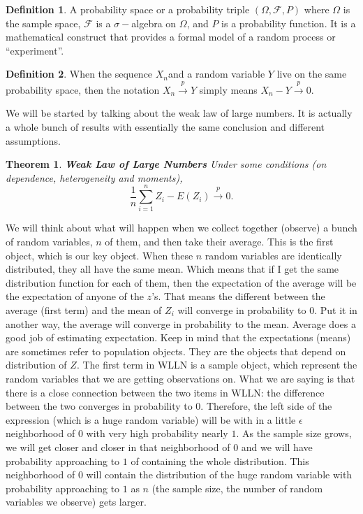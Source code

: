 \documentclass[11pt,a4paper]{amsart}
\theoremstyle{plain}
\newtheorem{theorem}{Theorem}
\theoremstyle{definition}
\newtheorem{definition}{Definition}
\begin{document}
	\begin{definition}
		A probability space or a probability triple $(\Omega ,\mathcal {F},P)$ where $\Omega$ is the sample space, $\mathcal {F}$ is a $\sigma-$algebra on $\Omega$, and $P$ is a probability function. It is a mathematical construct that provides a formal model of a random process or ``experiment''. 
	\end{definition}
	\begin{definition}
		When the sequence $X_{n}$and a random variable $Y$ live on the same probability space, then the notation $X_{n} \xrightarrow{p} Y$ simply means $X_{n} - Y \xrightarrow{p} 0$.
	\end{definition}
	We will be started by talking about the weak law of large numbers. It is actually a whole bunch of results with essentially the same conclusion and different assumptions.  
	\begin{theorem}
		\textbf{Weak Law of Large Numbers} Under some conditions (on dependence, heterogeneity and moments), 
		\[	\frac{1}{n} \sum_{i=1}^{n} Z_{i} - E(Z_{i}) \xrightarrow{p} 0.	\]
	\end{theorem}
	We will think about what will happen when we collect together (observe) a bunch of random variables, $n$ of them, and then take their average. This is the first object, which is our key object. When these $n$ random variables are identically distributed, they all have the same mean. Which means that if I get the same distribution function for each of them, then the expectation of the average will be the expectation of anyone of the $z$'s. That means the different between the average (first term) and the mean of $Z_{i}$ will converge in probability to $0$. Put it in another way, the average will converge in probability to the mean. Average does a good job of estimating expectation. Keep in mind that the expectations (means) are sometimes refer to population objects. They are the objects that depend on distribution of $Z$. The first term in WLLN is a sample object, which represent the random variables that we are getting observations on. What we are saying is that there is a close connection between the two items in WLLN: the difference between the two converges in probability to $0$. Therefore, the left side of the expression (which is a huge random variable) will be with in a little $\epsilon$ neighborhood of $0$ with very high probability nearly $1$. As the sample size grows, we will get closer and closer in that neighborhood of $0$ and we will have probability approaching to $1$ of containing the whole distribution. This neighborhood of $0$ will contain the distribution of the huge random variable with probability approaching to $1$ as $n$ (the sample size, the number of random variables we observe)  gets larger.
	
\end{document}
